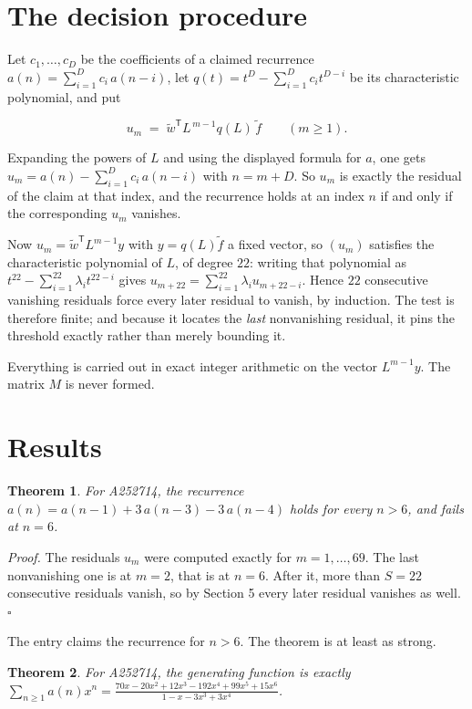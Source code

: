 \documentclass[11pt]{article}
\newtheorem{theorem}{Theorem}
\theoremstyle{definition}
\begin{document}
\section{The decision procedure}

Let $c_1,\dots,c_D$ be the coefficients of a claimed recurrence $a(n) = \sum_{i=1}^{D} c_i\,a(n-i)$, let $q(t) = t^{D} - \sum_{i=1}^{D} c_i t^{D-i}$ be its characteristic polynomial, and put

\[u_m \;=\; \tilde w^{\mathsf T} L^{\,m-1} q(L)\,\tilde f \qquad (m \ge 1).\]

Expanding the powers of $L$ and using the displayed formula for $a$, one gets $u_m = a(n) - \sum_{i=1}^{D} c_i\,a(n-i)$ with $n = m + D$. So $u_m$ is exactly the residual of the claim at that index, and the recurrence holds at an index $n$ if and only if the corresponding $u_m$ vanishes.

Now $u_m = \tilde w^{\mathsf T} L^{m-1} y$ with $y = q(L)\tilde f$ a fixed vector, so $(u_m)$ satisfies the characteristic polynomial of $L$, of degree $22$: writing that polynomial as $t^{22} - \sum_{i=1}^{22} \lambda_i t^{22-i}$ gives $u_{m+22} = \sum_{i=1}^{22} \lambda_i u_{m+22-i}$. Hence $22$ consecutive vanishing residuals force every later residual to vanish, by induction. The test is therefore finite; and because it locates the {\itshape last} nonvanishing residual, it pins the threshold exactly rather than merely bounding it.

Everything is carried out in exact integer arithmetic on the vector $L^{m-1}y$. The matrix $M$ is never formed.

\section{Results}

\begin{theorem} For A252714, the recurrence $a(n) = a(n-1) + 3\,a(n-3) - 3\,a(n-4)$ holds for every $n > 6$, and fails at $n = 6$.\end{theorem}

{\itshape Proof.} The residuals $u_m$ were computed exactly for $m = 1,\dots,69$. The last nonvanishing one is at $m = 2$, that is at $n = 6$. After it, more than $S = 22$ consecutive residuals vanish, so by Section 5 every later residual vanishes as well. $\square$

The entry claims the recurrence for $n > 6$. The theorem is at least as strong.

\begin{theorem} For A252714, the generating function is exactly $\sum_{n\ge 1} a(n)x^n = \frac{70x - 20x^{2} + 12x^{3} - 192x^{4} + 99x^{5} + 15x^{6}}{1 - x - 3x^{3} + 3x^{4}}$.\end{theorem}
\end{document}
